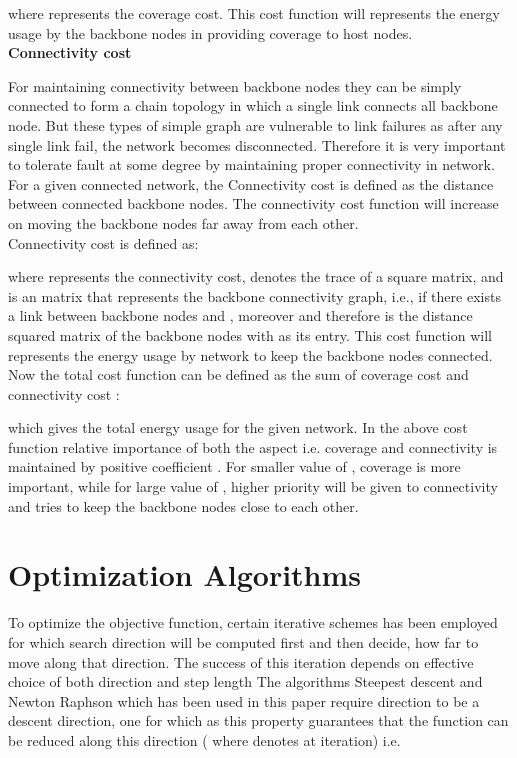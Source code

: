 \documentclass[11pt]{article}
\numberwithin{equation}{section}
\begin{document}
where  represents the coverage cost. This cost function will represents the energy usage by the backbone nodes in providing coverage to host nodes.\\

\noindent \textbf{Connectivity cost}

For maintaining connectivity between backbone nodes they can be simply connected to form a chain topology in which a single link connects all backbone node. But these types of simple graph are vulnerable to link failures as after any single link fail, the network becomes disconnected. Therefore it is very important to tolerate fault at some degree by maintaining proper connectivity in network. For a given connected network, the Connectivity cost is defined as the distance between connected backbone nodes. The connectivity cost function will increase on moving the backbone nodes far away from each other.\\

Connectivity cost is defined as:



where  represents the connectivity cost,  denotes the trace of a square matrix, and  is an  matrix that represents the backbone connectivity graph, i.e.,  if there exists a link between backbone nodes  and , moreover  and therefore  is the  distance squared matrix of the backbone nodes with  as its  entry. This cost function will represents the energy usage by network to keep the backbone nodes connected.\\

Now the total cost function  can be defined as the sum of coverage cost and connectivity cost :



which gives the total energy usage for the given network. In the above cost function relative importance of both the aspect i.e. coverage and connectivity is maintained by positive coefficient . For smaller value of , coverage is more important, while for large value of , higher priority will be given to connectivity and tries to keep the backbone nodes close to each other.
\section{Optimization Algorithms}




To optimize the objective function, certain iterative schemes has been employed for which search direction will be computed first and then decide, how far to move along that direction. The success of this iteration depends on effective choice of both direction  and step length 
 The algorithms Steepest descent and Newton Raphson which has been used in this paper require direction  to be a descent direction, one for which  as this property guarantees that the function  can be reduced along this direction ( where  denotes  at  iteration) i.e.
 
\end{document}
